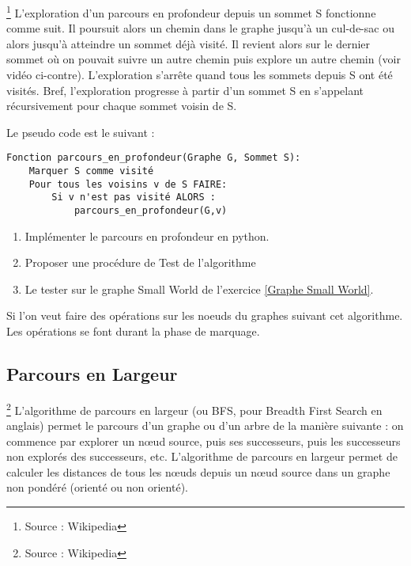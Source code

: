 \documentclass[12pt,fleqn]{article} %
\begin{document}
\begin{remark}\footnote{Source : Wikipedia}
	 L'exploration d'un parcours en profondeur depuis un sommet S fonctionne comme suit. Il poursuit alors un chemin dans le graphe jusqu'à un cul-de-sac ou alors jusqu'à atteindre un sommet déjà visité. Il revient alors sur le dernier sommet où on pouvait suivre un autre chemin puis explore un autre chemin (voir vidéo ci-contre). L'exploration s'arrête quand tous les sommets depuis S ont été visités. Bref, l'exploration progresse à partir d'un sommet S en s'appelant récursivement pour chaque sommet voisin de S.
\end{remark}

Le pseudo code est le suivant : 

\begin{center}
	\begin{varwidth}[t]{.5\textwidth}
		\begin{lstlisting}[language=Pseudo,linewidth = 14cm]
Fonction parcours_en_profondeur(Graphe G, Sommet S):
	Marquer S comme visité
	Pour tous les voisins v de S FAIRE:
		Si v n'est pas visité ALORS : 
			parcours_en_profondeur(G,v)
\end{lstlisting}
\end{varwidth}
\end{center}

\begin{exercise}
	\begin{enumerate}
		\item Implémenter le parcours en profondeur en python.
		\item Proposer une procédure de Test de l'algorithme
		\item Le tester sur le graphe Small World de l'exercice \ref{Graphe Small World}.
	\end{enumerate} 
\end{exercise}

\begin{remark}
	Si l'on veut faire des opérations sur les noeuds du graphes suivant cet algorithme. Les opérations se font durant la phase de marquage.
\end{remark}

\subsection{Parcours en Largeur}

\begin{remark}\footnote{Source : Wikipedia}
	L'algorithme de parcours en largeur (ou BFS, pour Breadth First Search en anglais) permet le parcours d'un graphe ou d'un arbre de la manière suivante : on commence par explorer un nœud source, puis ses successeurs, puis les successeurs non explorés des successeurs, etc. L'algorithme de parcours en largeur permet de calculer les distances de tous les nœuds depuis un nœud source dans un graphe non pondéré (orienté ou non orienté).
\end{remark}
\end{document}
